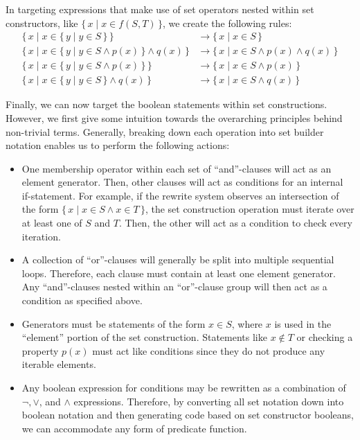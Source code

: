 \documentclass{article}
\newcommand{\Set}[2]{%
  \{\, #1 \mid #2 \, \}%
}
\begin{document}
In targeting expressions that make use of set operators nested within set constructors, like $\Set{x}{x \in f(S, T)}$, we create the following rules:
\begin{align}
  \Set{x}{x \in \Set{y}{y \in S}} &\rightarrow \Set{x}{x \in S}\\
  \Set{x}{x \in \Set{y}{y \in S \land p(x)} \land q(x)} &\rightarrow \Set{x}{x \in S \land p(x) \land q(x)}\\
  \Set{x}{x \in \Set{y}{y \in S \land p(x)}} &\rightarrow \Set{x}{x \in S \land p(x)}\\
  \Set{x}{x \in \Set{y}{y \in S} \land q(x)} &\rightarrow \Set{x}{x \in S \land q(x)}
\end{align}

Finally, we can now target the boolean statements within set constructions. However, we first give some intuition towards the overarching principles behind non-trivial terms. Generally, breaking down each operation into set builder notation enables us to perform the following actions:
\begin{itemize}
  \item One membership operator within each set of ``and''-clauses will act as an element generator. Then, other clauses will act as conditions for an internal if-statement. For example, if the rewrite system observes an intersection of the form $\Set{x}{x \in S \land x \in T}$, the set construction operation must iterate over at least one of $S$ and $T$. Then, the other will act as a condition to check every iteration.
  \item A collection of ``or''-clauses will generally be split into multiple sequential loops. Therefore, each clause must contain at least one element generator. Any ``and''-clauses nested within an ``or''-clause group will then act as a condition as specified above.
  \item Generators must be statements of the form $x \in S$, where $x$ is used in the ``element'' portion of the set construction. Statements like $x \notin T$ or checking a property $p(x)$ must act like conditions since they do not produce any iterable elements.
  \item Any boolean expression for conditions may be rewritten as a combination of $\lnot, \lor$, and $\land$ expressions. Therefore, by converting all set notation down into boolean notation and then generating code based on set constructor booleans, we can accommodate any form of predicate function.
\end{itemize}
\end{document}
